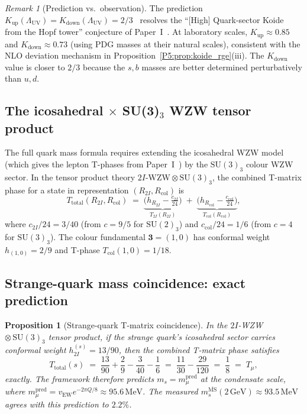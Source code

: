 \documentclass[11pt,a4paper]{article}
\newtheorem{proposition}[theorem]{Proposition}
\theoremstyle{definition}
\theoremstyle{remark}
\newtheorem{remark}[theorem]{Remark}
\newcommand{\LUV}{\Lambda_{\mathrm{UV}}}
\begin{document}
\begin{remark}[Prediction vs.\ observation]
\label{P5:rem:quark_koide_obs}
The prediction $K_{\mathrm{up}}(\LUV)=K_{\mathrm{down}}(\LUV)=2/3$~\cite{Koide1983}
resolves the ``[High] Quark-sector Koide from the Hopf tower''
conjecture of Paper~I~\cite{Paper1}.
At laboratory scales, $K_{\mathrm{up}}\approx0.85$ and
$K_{\mathrm{down}}\approx0.73$ (using PDG masses at their natural scales),
consistent with the NLO deviation mechanism in
Proposition~\ref{P5:prop:koide_rge}(iii).
The $K_{\mathrm{down}}$ value is closer to $2/3$ because the
$s,b$ masses are better determined perturbatively than $u,d$.
\end{remark}

\subsection{The icosahedral $\times$ SU(3)$_3$ WZW tensor product}
\label{P5:subsec:icos_su3}

The full quark mass formula requires extending the icosahedral WZW model
(which gives the lepton T-phases from Paper~I~\cite{Paper1}) by the $\mathrm{SU}(3)_3$
colour WZW sector.  In the tensor product theory
$2I\text{-WZW}\otimes\mathrm{SU}(3)_3$, the combined T-matrix phase for
a state in representation $(R_{2I}, R_{\mathrm{col}})$ is
\begin{equation}
  T_{\mathrm{total}}(R_{2I},R_{\mathrm{col}})
  \;=\;
  \underbrace{\bigl(h_{R_{2I}} - \tfrac{c_{2I}}{24}\bigr)}_{T_{2I}(R_{2I})}
  \;+\;
  \underbrace{\bigl(h_{R_{\mathrm{col}}} - \tfrac{c_{\mathrm{col}}}{24}\bigr)}_{T_{\mathrm{col}}(R_{\mathrm{col}})},
  \label{P5:eq:T_tensor_product}
\end{equation}
where $c_{2I}/24 = 3/40$ (from $c=9/5$ for $\mathrm{SU}(2)_3$) and
$c_{\mathrm{col}}/24 = 1/6$ (from $c=4$ for $\mathrm{SU}(3)_3$).
The colour fundamental $\mathbf{3}=(1,0)$ has conformal weight
$h_{(1,0)}=2/9$ and T-phase $T_{\mathrm{col}}(1,0)=1/18$.

\subsection{Strange-quark mass coincidence: exact prediction}
\label{P5:subsec:squark}

\begin{proposition}[Strange-quark T-matrix coincidence]
\label{P5:prop:squark}
In the $2I$-WZW\,$\otimes\,\mathrm{SU}(3)_3$ tensor product, if the
strange quark's icosahedral sector carries conformal weight
$h_{2I}^{(s)} = 13/90$, then the combined T-matrix phase satisfies
\begin{equation}
  T_{\mathrm{total}}(s)
  \;=\; \frac{13}{90} + \frac{2}{9} - \frac{3}{40} - \frac{1}{6}
  \;=\; \frac{11}{30} - \frac{29}{120}
  \;=\; \frac{1}{8}
  \;=\; T_\mu,
  \label{P5:eq:Ts_Tmu}
\end{equation}
\emph{exactly}.  The framework therefore predicts $m_s = m_\mu^{\mathrm{pred}}$
at the condensate scale, where $m_\mu^{\mathrm{pred}}=v_{\mathrm{EW}}e^{-2\pi Q/8}\approx95.6\,\mathrm{MeV}$.
The measured $m_s^{\overline{\mathrm{MS}}}(2\,\mathrm{GeV})\approx93.5\,\mathrm{MeV}$
agrees with this prediction to $\mathbf{2.2\%}$.
\end{proposition}
\end{document}
